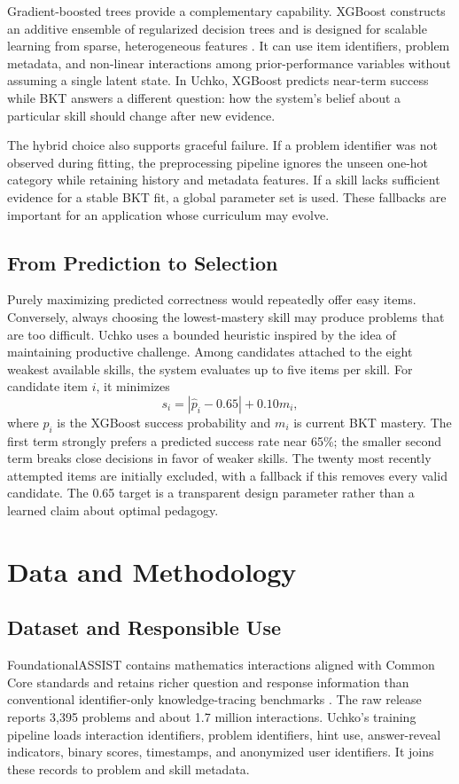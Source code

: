 \documentclass[conference]{IEEEtran}
\begin{document}
Gradient-boosted trees provide a complementary capability. XGBoost constructs an additive ensemble of regularized decision trees and is designed for scalable learning from sparse, heterogeneous features \cite{chen2016xgboost}. It can use item identifiers, problem metadata, and non-linear interactions among prior-performance variables without assuming a single latent state. In Uchko, XGBoost predicts near-term success while BKT answers a different question: how the system's belief about a particular skill should change after new evidence.

The hybrid choice also supports graceful failure. If a problem identifier was not observed during fitting, the preprocessing pipeline ignores the unseen one-hot category while retaining history and metadata features. If a skill lacks sufficient evidence for a stable BKT fit, a global parameter set is used. These fallbacks are important for an application whose curriculum may evolve.

\subsection{From Prediction to Selection}
Purely maximizing predicted correctness would repeatedly offer easy items. Conversely, always choosing the lowest-mastery skill may produce problems that are too difficult. Uchko uses a bounded heuristic inspired by the idea of maintaining productive challenge. Among candidates attached to the eight weakest available skills, the system evaluates up to five items per skill. For candidate item $i$, it minimizes
\begin{equation}
s_i=\left|\hat{p}_i-0.65\right|+0.10m_i,
\end{equation}
where $\hat{p}_i$ is the XGBoost success probability and $m_i$ is current BKT mastery. The first term strongly prefers a predicted success rate near 65\%; the smaller second term breaks close decisions in favor of weaker skills. The twenty most recently attempted items are initially excluded, with a fallback if this removes every valid candidate. The 0.65 target is a transparent design parameter rather than a learned claim about optimal pedagogy.

\section{Data and Methodology}
\subsection{Dataset and Responsible Use}
FoundationalASSIST contains mathematics interactions aligned with Common Core standards and retains richer question and response information than conventional identifier-only knowledge-tracing benchmarks \cite{worden2026foundationalassist}. The raw release reports 3,395 problems and about 1.7 million interactions. Uchko's training pipeline loads interaction identifiers, problem identifiers, hint use, answer-reveal indicators, binary scores, timestamps, and anonymized user identifiers. It joins these records to problem and skill metadata.
\end{document}
